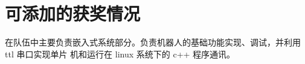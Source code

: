 


\section{\faHeartO 可添加的获奖情况}
\begin{spacing}{1.125}
在队伍中主要负责嵌入式系统部分。负责机器人的基础功能实现、调试，并利用 ttl 串口实现单片
机和运行在 linux 系统下的 c++ 程序通讯。
\end{spacing}
\begin{spacing}{1.125}
\end{spacing}

